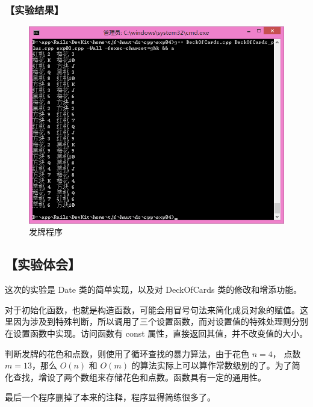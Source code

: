 \subsubsection*{【实验结果】}
\begin{figure}[htp]
\centering
\includegraphics[width=\textwidth]{exp04/exp03.png}
\caption{\label{out04_03}发牌程序}
\end{figure}


\subsection*{【实验体会】}
这次的实验是 Date 类的简单实现，以及对 DeckOfCards 类的修改和增添功能。

对于初始化函数，也就是构造函数，可能会用冒号句法来简化成员对象的赋值。这里因为涉及到特殊判断，所以调用了三个设置函数，而对设置值的特殊处理则分别在设置函数中实现。访问函数有 const 属性，直接返回其值，并不改变值的大小。

判断发牌的花色和点数，则使用了循环查找的暴力算法，由于花色 $n = 4$， 点数 $m = 13$，那么 $O(n)$ 和 $O(m)$ 的算法实际上可以算作常数级别的了。为了简化查找，增设了两个数组来存储花色和点数。函数具有一定的通用性。

最后一个程序删掉了本来的注释，程序显得简练很多了。
